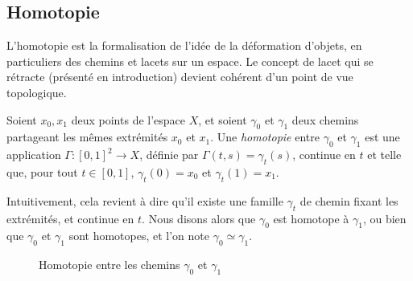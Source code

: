 \subsection{Homotopie}\label{sec:homotopy}

L'homotopie est la formalisation de l'idée de la déformation d'objets, en particuliers des chemins et lacets sur un espace. Le concept de lacet qui se rétracte (présenté en introduction) devient cohérent d'un point de vue topologique.

\begin{definition}\label{def:homotopy-paths}
Soient $x_0, x_1$ deux points de l'espace $X$, et soient $\gamma_0$ et $\gamma_1$ deux chemins partageant les mêmes extrémités $x_0$ et $x_1$. Une \emph{homotopie} entre $\gamma_0$ et $\gamma_1$ est une application $\Gamma:[0,1]^2\to X$, définie par $\Gamma(t,s)=\gamma_t(s)$, continue en $t$ et telle que, pour tout $t\in[0,1]$, $\gamma_t(0)=x_0$ et $\gamma_t(1)=x_1$.

Intuitivement, cela revient à dire qu'il existe une famille $\gamma_t$ de chemin fixant les extrémités, et continue en $t$. Nous disons alors que $\gamma_0$ est homotope à $\gamma_1$, ou bien que $\gamma_0$ et $\gamma_1$ sont homotopes, et l'on note $\gamma_0\simeq\gamma_1$.
\end{definition}

\begin{figure}[H]
    \centering
    \caption{Homotopie entre les chemins $\gamma_0$ et $\gamma_1$}
    \label{tkz:path-homotopy}
\end{figure}

